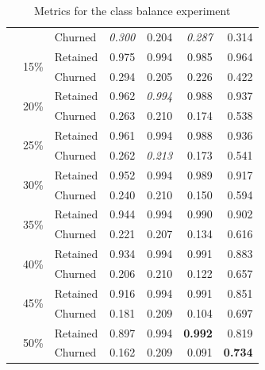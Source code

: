 \documentclass{kththesis}
\begin{document}
\begin{table}
\begin{tabular}{lllrrrr}
     &     & Churned &  \textit{0.300} &  0.204 &   \textit{0.287} &  0.314 \\
\cline{2-7}
     & \multirow{2}{*}{15\%} & Retained &  0.975 &  0.994 &   0.985 &  0.964 \\
     &     & Churned &  0.294 &  0.205 &   0.226 &  0.422 \\
\cline{2-7}
     & \multirow{2}{*}{20\%} & Retained &  0.962 &  \textit{0.994} &   0.988 &  0.937 \\
     &     & Churned &  0.263 &  0.210 &   0.174 &  0.538 \\
\cline{2-7}
     & \multirow{2}{*}{25\%} & Retained &  0.961 &  0.994 &   0.988 &  0.936 \\
     &     & Churned &  0.262 &  \textit{0.213} &   0.173 &  0.541 \\
\cline{2-7}
     & \multirow{2}{*}{30\%} & Retained &  0.952 &  0.994 &   0.989 &  0.917 \\
     &     & Churned &  0.240 &  0.210 &   0.150 &  0.594 \\
\cline{2-7}
     & \multirow{2}{*}{35\%} & Retained &  0.944 &  0.994 &   0.990 &  0.902 \\
     &     & Churned &  0.221 &  0.207 &   0.134 &  0.616 \\
\cline{2-7}
     & \multirow{2}{*}{40\%} & Retained &  0.934 &  0.994 &   0.991 &  0.883 \\
     &     & Churned &  0.206 &  0.210 &   0.122 &  0.657 \\
\cline{2-7}
     & \multirow{2}{*}{45\%} & Retained &  0.916 &  0.994 &   0.991 &  0.851 \\
     &     & Churned &  0.181 &  0.209 &   0.104 &  0.697 \\
\cline{2-7}
     & \multirow{2}{*}{50\%} & Retained &  0.897 &  0.994 &   \textbf{0.992} &  0.819 \\
     &     & Churned &  0.162 &  0.209 &   0.091 &  \textbf{0.734} \\
\bottomrule
\end{tabular}
\caption{Metrics for the class balance experiment}
\label{tab:class_balance}
\end{table}

\end{document}
